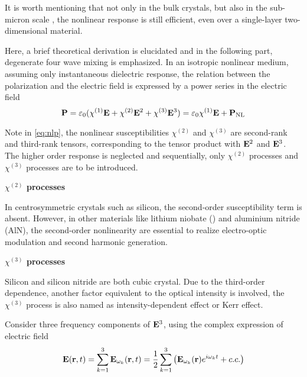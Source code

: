 It is worth mentioning that not only in the bulk crystals, but also in the sub-micron scale \cite{Leuthold2010}, the nonlinear response is still efficient, even over a single-layer two-dimensional material.

Here, a brief theoretical derivation is elucidated and in the following part, degenerate four wave mixing is emphasized. In an isotropic nonlinear medium, assuming only instantaneous dielectric response, the relation between the polarization and the electric field is expressed by a power series in the electric field
\begin{equation}\label{eq:nlp}
    \vb{P} = \varepsilon_0 \large (\chi^{(1)}\vb{E} + \chi^{(2)}\vb{E}^2 + \chi^{(3)}\vb{E}^3)
    = \varepsilon_0 \chi^{(1)}\vb{E} + \vb{P}_\mathrm{NL}
\end{equation}

Note in \autoref{eq:nlp}, the nonlinear susceptibilities $\chi^{(2)}$ and $\chi^{(3)}$ are second-rank and third-rank tensors, corresponding to the tensor product with $\vb{E}^2$ and $\vb{E}^3$. The higher order response is neglected and sequentially, only $\chi^{(2)}$ processes and $\chi^{(3)}$ processes are to be introduced.

\textbf{$\chi^{(2)}$ processes} 

In centrosymmetric crystals such as silicon, the second-order susceptibility term is absent. However, in other materials like lithium niobate () and aluminium nitride (AlN), the second-order nonlinearity are essential to realize electro-optic modulation and second harmonic generation.

\textbf{$\chi^{(3)}$ processes} 

Silicon and silicon nitride are both cubic crystal. Due to the third-order dependence, another factor equivalent to the optical intensity is involved, the $\chi^{(3)}$ process is also named as intensity-dependent effect or Kerr effect.

Consider three frequency components of $\vb{E}^3$, using the complex expression of electric field
\begin{equation}
    \vb{E}(\vb{r}, t) = \sum_{k=1}^3 \vb{E}_{\omega_k}(\vb{r}, t) =  \frac{1}{2} \sum_{k=1}^3 \qty ( \vb{E}_{\omega_k}(\vb{r})e^{i\omega_k t} + c.c.)
\end{equation}

